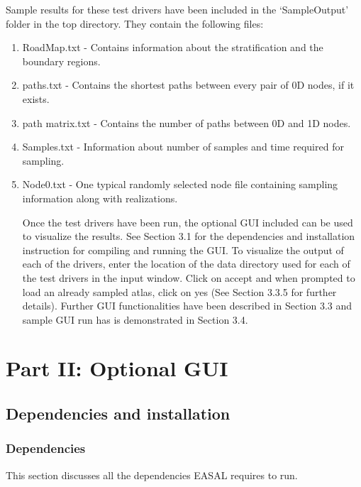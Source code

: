\documentclass[10pt]{article}
\begin{document}
Sample results for these test drivers have been included in the `SampleOutput' folder in the top directory.
They contain the following files:
\begin{enumerate}
\item RoadMap.txt - Contains information about the stratification and the boundary regions.
\item paths.txt - Contains the shortest paths between every pair of 0D nodes, if it exists.
\item path matrix.txt - Contains the number of paths between 0D and 1D nodes.
\item Samples.txt - Information about number of samples and time required for sampling.
\item Node0.txt - One typical randomly selected node file containing sampling information along with realizations.

Once the test drivers have been run, the optional GUI included can be used to visualize the results. See
Section 3.1 for the dependencies and installation instruction for compiling and running the GUI. To visualize
the output of each of the drivers, enter the location of the data directory used for each of the test drivers in
the input window. Click on accept and when prompted to load an already sampled atlas, click on yes (See
Section 3.3.5 for further details). Further GUI functionalities have been described in Section 3.3 and sample
GUI run has is demonstrated in Section 3.4.

\end{enumerate}




\section{Part II: Optional GUI}
\label{part2}
\subsection{Dependencies and installation}
\label{dependency}

\subsubsection{Dependencies}

This section discusses all the dependencies EASAL requires to run.
\end{document}
